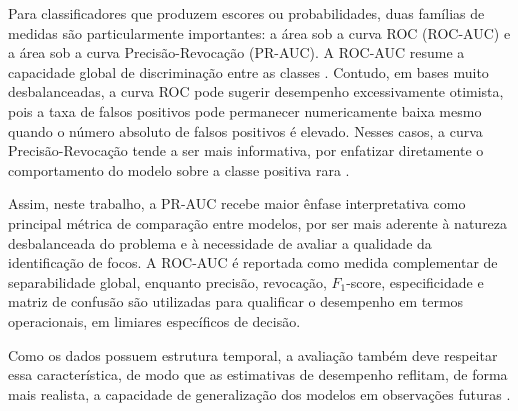 Para classificadores que produzem escores ou probabilidades, duas famílias de medidas são particularmente importantes: a área sob a curva ROC (ROC-AUC) e a área sob a curva Precisão-Revocação (PR-AUC). A ROC-AUC resume a capacidade global de discriminação entre as classes \cite{fawcett2006roc}. Contudo, em bases muito desbalanceadas, a curva ROC pode sugerir desempenho excessivamente otimista, pois a taxa de falsos positivos pode permanecer numericamente baixa mesmo quando o número absoluto de falsos positivos é elevado. Nesses casos, a curva Precisão-Revocação tende a ser mais informativa, por enfatizar diretamente o comportamento do modelo sobre a classe positiva rara \cite{saito2015prc,davis2006relationship}.

Assim, neste trabalho, a PR-AUC recebe maior ênfase interpretativa como principal métrica de comparação entre modelos, por ser mais aderente à natureza desbalanceada do problema e à necessidade de avaliar a qualidade da identificação de focos. A ROC-AUC é reportada como medida complementar de separabilidade global, enquanto precisão, revocação, $F_1$-score, especificidade e matriz de confusão são utilizadas para qualificar o desempenho em termos operacionais, em limiares específicos de decisão.

Como os dados possuem estrutura temporal, a avaliação também deve respeitar essa característica, de modo que as estimativas de desempenho reflitam, de forma mais realista, a capacidade de generalização dos modelos em observações futuras \cite{andrianarivony2024review}.